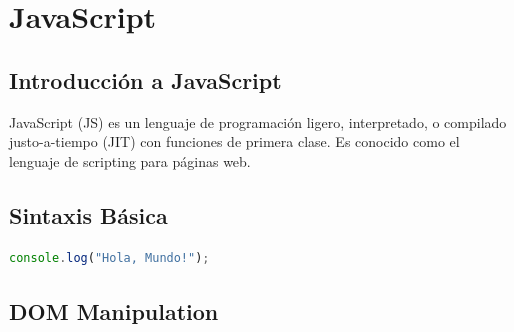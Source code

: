 \chapter{JavaScript}
\section{Introducción a JavaScript}
JavaScript (JS) es un lenguaje de programación ligero, interpretado, o compilado justo-a-tiempo (JIT) con funciones de primera clase. Es conocido como el lenguaje de scripting para páginas web.

\section{Sintaxis Básica}
\begin{lstlisting}[language=JavaScript, caption=Hola Mundo en JavaScript]
console.log("Hola, Mundo!");
\end{lstlisting}

\section{DOM Manipulation}

